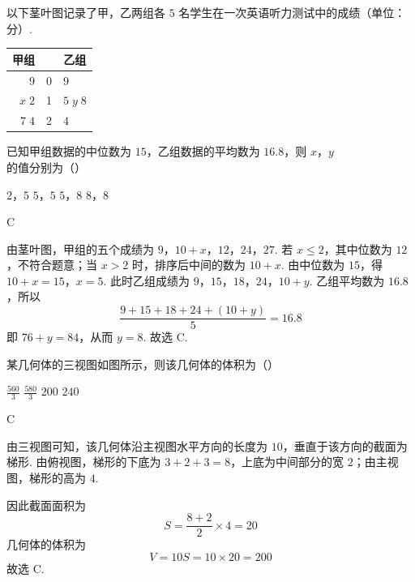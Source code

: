 \begin{problem}
以下茎叶图记录了甲，乙两组各 \(5\) 名学生在一次英语听力测试中的成绩（单位：分）.

\begin{center}
\begin{tabular}{r|c|l}
\multicolumn{1}{c}{甲组} & & \multicolumn{1}{c}{乙组} \\
\hline
\(9\) & 0 & \(9\) \\
\(\mathit{x}\;2\) & 1 & \(5\;\mathit{y}\;8\) \\
\(7\;4\) & 2 & \(4\)
\end{tabular}
\end{center}

已知甲组数据的中位数为 \(15\)，乙组数据的平均数为 \(16.8\)，则 \(x\)，\(y\) 的值分别为（\quad）

\choices
    {\(2\)，\(5\)}
    {\(5\)，\(5\)}
    {\(5\)，\(8\)}
    {\(8\)，\(8\)}

\begin{answer}
C
\end{answer}

\begin{solution}
由茎叶图，甲组的五个成绩为 \(9\)，\(10+x\)，\(12\)，\(24\)，\(27\). 若 \(x\leqslant2\)，其中位数为 \(12\)，不符合题意；当 \(x>2\) 时，排序后中间的数为 \(10+x\). 由中位数为 \(15\)，得
\(10+x=15\)，\(x=5\).
此时乙组成绩为 \(9\)，\(15\)，\(18\)，\(24\)，\(10+y\). 乙组平均数为 \(16.8\)，所以
\[
\frac{9+15+18+24+(10+y)}{5}=16.8
\]
即 \(76+y=84\)，从而 \(y=8\). 故选 C.
\end{solution}
\end{problem}

\begin{problem}
某几何体的三视图如图所示，则该几何体的体积为（\quad）



\choices
    {\(\frac{560}{3}\)}
    {\(\frac{580}{3}\)}
    {\(200\)}
    {\(240\)}

\begin{answer}
C
\end{answer}

\begin{solution}
由三视图可知，该几何体沿主视图水平方向的长度为 \(10\)，垂直于该方向的截面为梯形. 由俯视图，梯形的下底为 \(3+2+3=8\)，上底为中间部分的宽 \(2\)；由主视图，梯形的高为 \(4\).

因此截面面积为
\[
S=\frac{8+2}{2}\times4=20
\]
几何体的体积为
\[
V=10S=10\times20=200
\]
故选 C.
\end{solution}
\end{problem}

